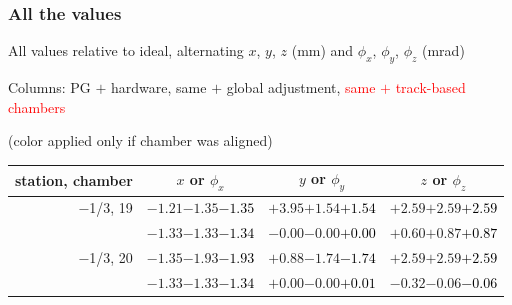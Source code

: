 \documentclass[compress]{beamer}
\begin{document}
\begin{frame}
\frametitle{All the values}
\tiny

All values relative to ideal, alternating $x$, $y$, $z$ (mm) and $\phi_x$, $\phi_y$, $\phi_z$ (mrad)

Columns: PG $+$ hardware, same $+$ global adjustment, \textcolor{red}{same $+$ track-based chambers}

\hfill (color applied only if chamber was aligned)

\vfill
\renewcommand{\arraystretch}{1.1}
\begin{tabular}{r | c | c | c}
station, chamber & $x$ or $\phi_x$ & $y$ or $\phi_y$ & $z$ or $\phi_z$ \\\hline
$-$1/3, 19 & $-1.21$\hspace{0.1 cm}$-1.35$\hspace{0.1 cm}\textcolor{black}{$-1.35$} & $+3.95$\hspace{0.1 cm}$+1.54$\hspace{0.1 cm}\textcolor{black}{$+1.54$} & $+2.59$\hspace{0.1 cm}$+2.59$\hspace{0.1 cm}\textcolor{black}{$+2.59$} \\
           & $-1.33$\hspace{0.1 cm}$-1.33$\hspace{0.1 cm}\textcolor{black}{$-1.34$} & $-0.00$\hspace{0.1 cm}$-0.00$\hspace{0.1 cm}\textcolor{black}{$+0.00$} & $+0.60$\hspace{0.1 cm}$+0.87$\hspace{0.1 cm}\textcolor{black}{$+0.87$} \\
$-$1/3, 20 & $-1.35$\hspace{0.1 cm}$-1.93$\hspace{0.1 cm}\textcolor{black}{$-1.93$} & $+0.88$\hspace{0.1 cm}$-1.74$\hspace{0.1 cm}\textcolor{black}{$-1.74$} & $+2.59$\hspace{0.1 cm}$+2.59$\hspace{0.1 cm}\textcolor{black}{$+2.59$} \\
           & $-1.33$\hspace{0.1 cm}$-1.33$\hspace{0.1 cm}\textcolor{black}{$-1.34$} & $+0.00$\hspace{0.1 cm}$-0.00$\hspace{0.1 cm}\textcolor{black}{$+0.01$} & $-0.32$\hspace{0.1 cm}$-0.06$\hspace{0.1 cm}\textcolor{black}{$-0.06$} \\

\end{tabular}
\end{frame}
\end{document}
